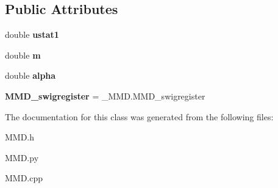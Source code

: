 \subsection*{Public Attributes}
\begin{DoxyCompactItemize}
\item 
double {\bfseries ustat1}\hypertarget{classMMD_a04babcd856518cc0a393f2987bc2f0ab}{}\label{classMMD_a04babcd856518cc0a393f2987bc2f0ab}

\item 
double {\bfseries m}\hypertarget{classMMD_a2ab01d30d080648d1e895daea9019aac}{}\label{classMMD_a2ab01d30d080648d1e895daea9019aac}

\item 
double {\bfseries alpha}\hypertarget{classMMD_a50f0350ede45720e377c7c3122c68bbd}{}\label{classMMD_a50f0350ede45720e377c7c3122c68bbd}

\item 
{\bfseries M\+M\+D\+\_\+swigregister} = \+\_\+\+M\+M\+D.\+M\+M\+D\+\_\+swigregister\hypertarget{classMMD_a14c05e757c197ab0f531c2dbc0852d2f}{}\label{classMMD_a14c05e757c197ab0f531c2dbc0852d2f}

\end{DoxyCompactItemize}


The documentation for this class was generated from the following files\+:\begin{DoxyCompactItemize}
\item 
M\+M\+D.\+h\item 
M\+M\+D.\+py\item 
M\+M\+D.\+cpp\end{DoxyCompactItemize}
